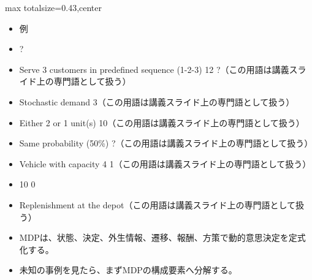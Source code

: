 \clearpage
{}
\begin{minipage}[t]{0.405\textwidth}
\begin{adjustbox}{max totalsize={\textwidth}{0.43\textheight},center}
\begin{minipage}{\textwidth}\scriptsize
{}\begin{itemize}
\item 例
\item ?
\item Serve 3 customers in predefined sequence (1-2-3) 12 ?（この用語は講義スライド上の専門語として扱う）
\item Stochastic demand 3（この用語は講義スライド上の専門語として扱う）
\item Either 2 or 1 unit(s) 10（この用語は講義スライド上の専門語として扱う）
\item Same probability (50\%) ?（この用語は講義スライド上の専門語として扱う）
\item Vehicle with capacity 4 1（この用語は講義スライド上の専門語として扱う）
\item 10 0
\item Replenishment at the depot（この用語は講義スライド上の専門語として扱う）
\end{itemize}\begin{itemize}
\item MDPは、状態、決定、外生情報、遷移、報酬、方策で動的意思決定を定式化する。
\item 未知の事例を見たら、まずMDPの構成要素へ分解する。
\end{itemize}
\end{minipage}
\end{adjustbox}
\end{minipage}\hfill
